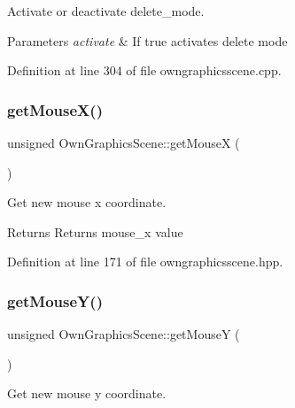 Activate or deactivate delete\+\_\+mode. 


\begin{DoxyParams}{Parameters}
{\em activate} & If true activates delete mode \\
\hline
\end{DoxyParams}


Definition at line 304 of file owngraphicsscene.\+cpp.

\mbox{\label{classOwnGraphicsScene_a6e54bd43db758bcd4f7cc1dd4544232e}} 
\subsubsection{\texorpdfstring{get\+Mouse\+X()}{getMouseX()}}
{\footnotesize\ttfamily unsigned Own\+Graphics\+Scene\+::get\+MouseX (\begin{DoxyParamCaption}{ }\end{DoxyParamCaption})\hspace{0.3cm}{\ttfamily [inline]}}



Get new mouse x coordinate. 

\begin{DoxyReturn}{Returns}
Returns mouse\+\_\+x value 
\end{DoxyReturn}


Definition at line 171 of file owngraphicsscene.\+hpp.

\mbox{\label{classOwnGraphicsScene_a3fd2942e9930fc2dda41844622dc8a35}} 
\subsubsection{\texorpdfstring{get\+Mouse\+Y()}{getMouseY()}}
{\footnotesize\ttfamily unsigned Own\+Graphics\+Scene\+::get\+MouseY (\begin{DoxyParamCaption}{ }\end{DoxyParamCaption})\hspace{0.3cm}{\ttfamily [inline]}}



Get new mouse y coordinate. 

